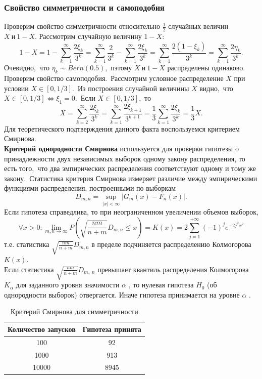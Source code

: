 \documentclass[11pt]{article}
\begin{document}
	\subsubsection{Свойство симметричности и самоподобия}
	\indent Проверим свойство симметричности относительно {$\frac{1}{2}$} случайных величин {$X~ \text{и}~  1-X$}. Рассмотрим случайную величину  {$1-X$}:
	$$ 1 - X = 1 - \sum_{k = 1}^{\infty}\frac{2\xi_k}{3^k} = \sum_{k = 1}^{\infty}\frac{2}{3^k} - \sum_{k = 1}^{\infty}\frac{2\xi_k}{3^k} =\sum_{k = 1}^{\infty}\frac{2(1 - \xi_k)}{3^k} = \sum_{k = 1}^{\infty}\frac{2\eta_k}{3^k}.$$
	Очевидно,\ что {$\eta_k \sim Bern(0.5)$},\ пэтому {$X~ \text{и}~  1-X$} распределены одинаково.\\
	\indent Проверим свойство самоподобия.\ Рассмотрим условное распределение {$X$} при условии {$X\in [0, 1/3]$}.\ Из построения случайной величины {$X$} видно,\ что  {$X\in [0, 1/3]\Leftrightarrow \xi_1 = 0$}.\ Если {$X\in [0, 1/3]$},\ то
	$$X = \sum_{k = 2}^{\infty}\frac{2\xi_k}{3^k} = \sum_{k = 1}^{\infty}\frac{2\xi_{k+1}}{3^{k+1}} = \frac{1}{3}\sum_{k = 1}^{\infty}\frac{2\xi_k}{3^k} = \frac{1}{3}X.$$
	\indent Для теоретического подтверждения данного факта воспользуемся критерием Смирнова. \\ \textbf{Критерий однородности Смирнова} используется для проверки гипотезы о принадлежности двух независимых выборок одному закону распределения, то есть того,\  что два эмпирических распределения соответствуют одному и тому же закону.\ Статистика критерия Смирнова измеряет различие ме­жду эмпирическими функциями распределения, построенными по выборкам
	$$D_{m,n} = \sup\limits_{|x|<\infty}|G_m(x) - F_n(x)|.$$
	Если гипотеза  справедлива, то при неограниченном увеличении объемов выборок,$$\forall x>0\colon \lim _{m,n\to \infty }P({\sqrt {\frac{nm}{n+m}}}D_{m,n}\leqslant x)=K(x)=2\sum _{j=1 }^{+\infty }(-1)^{j}e^{-2j^{2}x^{2}}$$ т.е. статистика {$\sqrt{\frac{nm}{n+m}}D_{m,n}$} в пределе подчиняется распределению Колмогорова {$K(x)$}.\\
	\indent Если статистика {$ {\sqrt {\frac {nm}{n+m}}}D_{m,\;n}$}  превышает квантиль распределения Колмогорова {$ K_{\alpha }$}  для заданного уровня значимости {$ \alpha $} , то нулевая гипотеза {$ H_{0}$}  (об однородности выборок) отвергается. Иначе гипотеза принимается на уровне {$\alpha$ } .	
	
	\begin{table}[h]	
		\begin{center}
			\begin{tabular}[c]{ | c | c | }
				\hline
				Количество запусков & Гипотеза принята \\ \hline
				100 & 92  \\
				1000 & 913  \\
				10000 & 8945  \\
				\hline
				
			\end{tabular}
		\end{center}
		\caption{\label{tab:canonsummary2}Критерий Смирнова для симметричности }
	\end{table}
	
\end{document}
